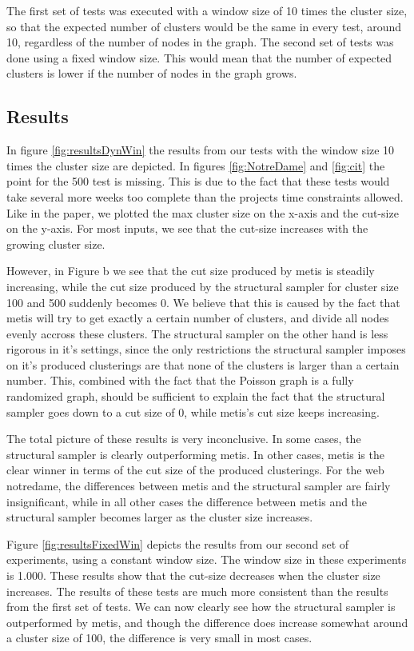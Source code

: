 \documentclass[a4paper]{article}
\begin{document}
The first set of tests was executed with a window size of 10 times the cluster size, so that the expected number of clusters would be the same in every test, around 10, regardless of the number of nodes in the graph. The second set of tests was done using a fixed window size. This would mean that the number of expected clusters is lower if the number of nodes in the graph grows.

\subsection{Results}
In figure \ref{fig:resultsDynWin} the results from our tests with the window size 10 times the cluster size are depicted. In figures \ref{fig:NotreDame} and \ref{fig:cit} the point for the 500 test is missing. This is due to the fact that these tests would take several more weeks too complete than the projects time constraints allowed. Like in the paper, we plotted the max cluster size on the x-axis and the cut-size on the y-axis. For most inputs, we see that the cut-size increases with the growing cluster size. 

However, in Figure b we see that the cut size produced by metis is steadily increasing, while the cut size produced by the structural sampler for cluster size 100 and 500 suddenly becomes 0. We believe that this is caused by the fact that metis will try to get exactly a certain number of clusters, and divide all nodes evenly accross these clusters. The structural sampler on the other hand is less rigorous in it's settings, since the only restrictions the structural sampler imposes on it's produced clusterings are that none of the clusters is larger than a certain number. This, combined with the fact that the Poisson graph is a fully randomized graph, should be sufficient to explain the fact that the structural sampler goes down to a cut size of 0, while metis's cut size keeps increasing.

The total picture of these results is very inconclusive. In some cases, the structural sampler is clearly outperforming metis. In other cases, metis is the clear winner in terms of the cut size of the produced clusterings. For the web notredame, the differences between metis and the structural sampler are fairly insignificant, while in all other cases the difference between metis and the structural sampler becomes larger as the cluster size increases. 

Figure \ref{fig:resultsFixedWin} depicts the results from our second set of experiments, using a constant window size. The window size in these experiments is 1.000. These results show that the cut-size decreases when the cluster size increases. The results of these tests are much more consistent than the results from the first set of tests. We can now clearly see how the structural sampler is outperformed by metis, and though the difference does increase somewhat around a cluster size of 100, the difference is very small in most cases.
\end{document}
